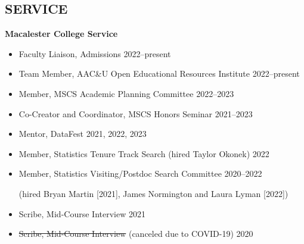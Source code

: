 \documentclass[margin]{res}
\begin{document}
\begin{resume}
\section{SERVICE}  

\textbf{Macalester College Service}
	\begin{itemize} %
	\item Faculty Liaison, Admissions \hfill 2022--present
	\item Team Member, AAC\&U Open Educational Resources Institute \hfill 2022--present
	\item Member, MSCS Academic Planning Committee \hfill 2022--2023
	\item Co-Creator and Coordinator, MSCS Honors Seminar \hfill 2021--2023
	\item Mentor, DataFest \hfill 2021, 2022, 2023
	\item Member, Statistics Tenure Track Search (hired Taylor Okonek) \hfill 2022 
	\item Member, Statistics Visiting/Postdoc Search Committee \hfill 2020--2022 \\\begin{small}(hired Bryan Martin [2021], James Normington and Laura Lyman [2022]) \end{small}
	\item Scribe, Mid-Course Interview \hfill 2021
	\item \sout{Scribe, Mid-Course Interview} (canceled due to COVID-19)  \hfill 2020 %
	\end{itemize}



\end{resume}
\end{document}
